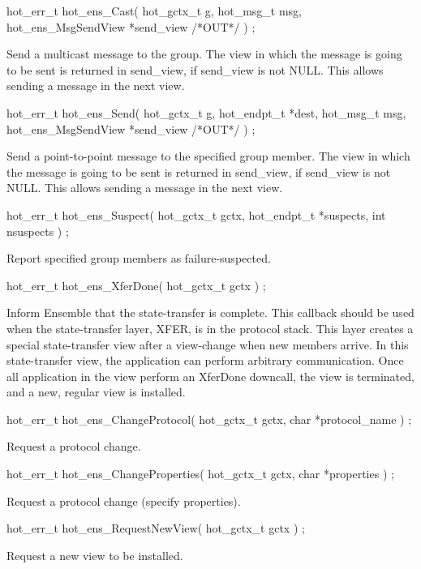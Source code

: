 \begin{codebox}
hot_err_t hot_ens_Cast(
  hot_gctx_t g,
  hot_msg_t msg, 
  hot_ens_MsgSendView *send_view	/*OUT*/
) ;
\end{codebox}
Send a multicast message to the group.
The view in which the message is going to be sent
is returned in send\_view, if send\_view is not NULL.
This allows sending a message in the next view. 

\begin{codebox}
hot_err_t hot_ens_Send(
        hot_gctx_t g, 
   hot_endpt_t *dest,
   hot_msg_t msg,
   hot_ens_MsgSendView *send_view /*OUT*/
) ;
\end{codebox}
Send a point-to-point message to the specified group member.
The view in which the message is going to be sent
is returned in send\_view, if send\_view is not NULL.
This allows sending a message in the next view. 


\begin{codebox}
hot_err_t hot_ens_Suspect(
   hot_gctx_t gctx,
   hot_endpt_t *suspects, 
   int nsuspects
) ;
\end{codebox}
Report specified group members as failure-suspected.

\begin{codebox}
hot_err_t hot_ens_XferDone(
   hot_gctx_t gctx
) ;
\end{codebox}
Inform Ensemble that the state-transfer is complete. 
This callback should be used when the state-transfer layer,
XFER, is in the protocol stack. This layer creates a special
state-transfer view after a view-change when new members arrive. 
In this state-transfer view, the application can perform arbitrary 
communication. Once all application in the view perform an XferDone
downcall, the view is terminated, and a new, regular view is
installed. 

\begin{codebox}
hot_err_t hot_ens_ChangeProtocol(
  hot_gctx_t gctx,
  char *protocol_name
) ;
\end{codebox}
Request a protocol change.

\begin{codebox}
hot_err_t hot_ens_ChangeProperties(
  hot_gctx_t gctx, 
  char *properties
) ;
\end{codebox}
Request a protocol change (specify properties).

\begin{codebox}
hot_err_t hot_ens_RequestNewView(
  hot_gctx_t gctx
) ;
\end{codebox}
Request a new view to be installed.

